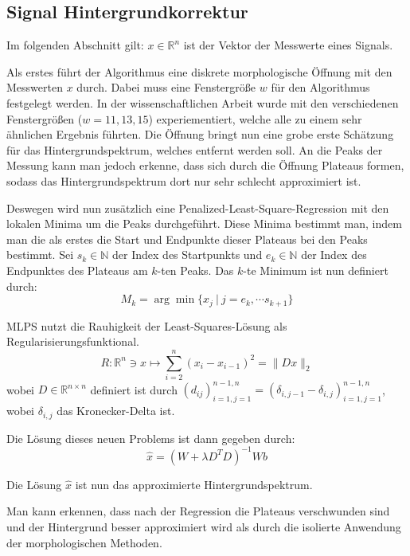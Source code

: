 \documentclass{article}
\newcommand{\R}[0]{\mathbb{R}}
\newcommand{\N}[0]{\mathbb{N}}
\begin{document}
\subsection{Signal Hintergrundkorrektur}

Im folgenden Abschnitt gilt: $x \in \R^n$ ist der Vektor der Messwerte eines Signals. 

Als erstes führt der Algorithmus eine diskrete morphologische Öffnung mit den Messwerten $x$ durch. Dabei muss eine Fenstergröße $w$ für den Algorithmus festgelegt werden.
In der wissenschaftlichen Arbeit wurde mit den verschiedenen Fenstergrößen ($w=11,13,15$) experiementiert, welche alle zu einem sehr ähnlichen Ergebnis führten.
Die Öffnung bringt nun eine grobe erste Schätzung für das Hintergrundspektrum, welches entfernt werden soll.
An die Peaks der Messung kann man jedoch erkenne, dass sich durch die Öffnung Plateaus formen, sodass das Hintergrundspektrum dort nur sehr schlecht approximiert ist.

Deswegen wird nun zusätzlich eine Penalized-Least-Square-Regression mit den lokalen Minima um die Peaks durchgeführt.
Diese Minima bestimmt man, indem man die als erstes die Start und Endpunkte dieser Plateaus bei den Peaks bestimmt.
Sei $s_k \in \N$ der Index des Startpunkts und $e_k \in \N$ der Index des Endpunktes des Plateaus am $k$-ten Peaks. Das $k$-te Minimum ist nun definiert durch:
\begin{equation}
    M_k = \arg\min \{x_j \: | \: j=e_k,\cdots s_{k+1}\}
\end{equation}

MLPS nutzt die Rauhigkeit der Least-Squares-Lösung als Regularisierungsfunktional.
\begin{equation}
    R: \R^n \ni x \mapsto \sum_{i=2}^{n} (x_i - x_{i-1})^2 = \lVert Dx \rVert_2
\end{equation}
wobei $D \in \R^{n\times n}$ definiert ist durch $(d_{ij})_{i=1,j=1}^{n-1,n} = (\delta_{i,j-1} - \delta_{i,j})_{i=1,j=1}^{n-1,n}$, wobei $\delta_{i,j}$ das Kronecker-Delta ist.

Die Lösung dieses neuen Problems ist dann gegeben durch:
\begin{equation}
    \hat{x} = (W + \lambda D^TD)^{-1}Wb
\end{equation}

Die Lösung $\hat{x}$ ist nun das approximierte Hintergrundspektrum.

Man kann erkennen, dass nach der Regression die Plateaus verschwunden sind und der Hintergrund besser approximiert wird als durch die isolierte Anwendung der morphologischen Methoden. 

\clearpage

\end{document}
